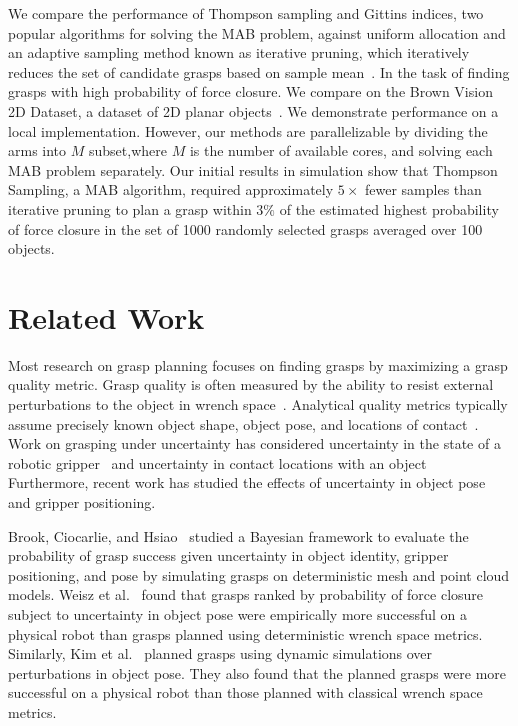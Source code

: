 \documentclass[10pt, conference]{ieeeconf}      %
\begin{document}
We compare the performance of Thompson sampling and Gittins indices, two popular algorithms for solving the MAB problem, against uniform allocation and an adaptive sampling method known as iterative pruning, which iteratively reduces the set of candidate grasps  based on sample mean~\cite{kehoe2012toward}. In the task of finding grasps with high probability of force closure.
We compare on the Brown Vision 2D Dataset, a dataset of 2D planar objects~\cite{brown, christopoulos2007handling}.
We demonstrate performance on a local implementation. However, our methods are parallelizable by dividing the arms into $M$ subset,where $M$ is the number of available cores, and solving each MAB problem separately\cite{glazebrook2000index}. 
Our initial results in simulation show that Thompson Sampling, a MAB algorithm, required approximately $5\times$ fewer samples than iterative pruning to plan a grasp within $3\%$ of the estimated highest probability of force closure in the set of 1000 randomly selected grasps averaged over 100 objects.


\section{Related Work}

Most research on grasp planning focuses on finding grasps by maximizing a grasp quality metric. Grasp quality is often measured by the ability to resist external perturbations to the object in wrench space~\cite{ferrari1992, miller2004graspit}. Analytical quality metrics typically assume precisely known object shape, object pose, and locations of contact~\cite{cheong2011output, ciocarlie2009}. Work on grasping under uncertainty has considered uncertainty in the state of a robotic gripper~\cite{goldberg1990bayesian, stulp2011learning} and uncertainty in contact locations with an object~\cite{zheng2005} Furthermore, recent work has studied the effects of uncertainty in object pose and gripper positioning\cite{brook2011collaborative, hsiao2011bayesian}.

Brook, Ciocarlie, and Hsiao~\cite{brook2011collaborative, hsiao2011bayesian} studied a Bayesian framework to evaluate the probability of grasp success given uncertainty in object identity, gripper positioning, and pose by simulating grasps on deterministic mesh and point cloud models.
Weisz et al.~\cite{weisz2012pose} found that grasps ranked by probability of force closure subject to uncertainty in object pose were empirically more successful on a physical robot than grasps planned using deterministic wrench space metrics. 
Similarly, Kim et al.~\cite{kim2012physically} planned grasps using dynamic simulations over perturbations in object pose. They also found that the planned grasps were more successful on a physical robot than those planned with classical wrench space metrics.
\end{document}

